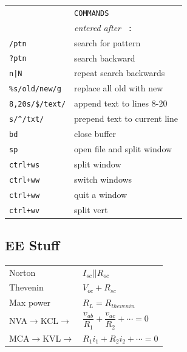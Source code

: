 \documentclass[a4paper,12pt]{article}
\begin{document}
\begin{multicols}{2}
\begin{tabular}{ll}
&\texttt{COMMANDS}\\
&\emph{entered after }\texttt{ :}\\
\texttt{/ptn}& search for pattern\\
\texttt{?ptn}& search backward\\
\texttt{n|N}& repeat search \textbar{} backwards\\
\texttt{\%s/old/new/g}&replace all old with new\\
\texttt{8,20s/\$/text/}&append text to lines 8-20\\
\texttt{s/\^{}/txt/}&prepend text to current line\\
\texttt{bd}&close buffer\\
\texttt{sp}&open file and split window\\
\texttt{ctrl+ws}&split window\\
\texttt{ctrl+ww}&switch windows\\
\texttt{ctrl+ww}&quit a window\\
\texttt{ctrl+wv}&split vert\\
\end{tabular}


\clearpage

\subsection*{EE Stuff}
\begin{tabular}{ll}
Norton&$I_{sc} || R_{oc}$\\

Thevenin&$V_{oc} + R_{sc}$\\

Max power &$R_L = R_{thevenin}$\\

NVA$\rightarrow$KCL$\rightarrow$& $\dfrac{v_{ab}}{R_1} + \dfrac{v_{ac}}{R_2} +
\cdots = 0$\\

MCA$\rightarrow$KVL$\rightarrow$& $R_1i_1 + R_2i_2 + \cdots = 0$\\
\end{tabular}


\end{multicols}
\end{document}
